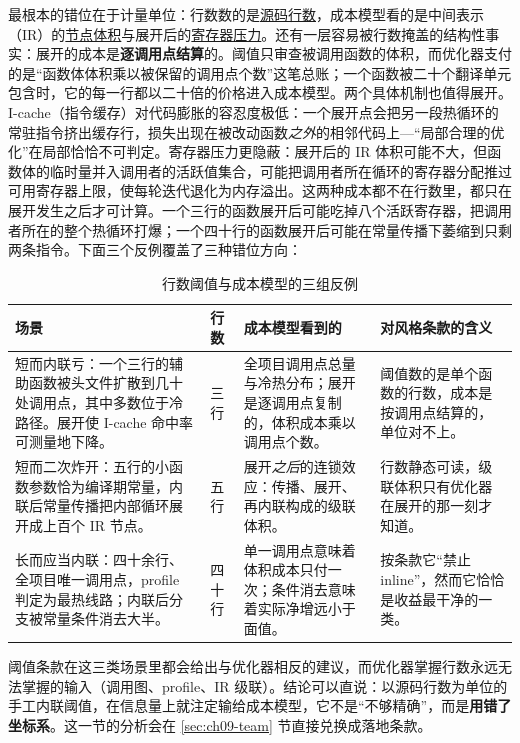 \documentclass[12pt,a4paper,fontset=fandol]{ctexbook}
\begin{document}
最根本的错位在于计量单位：行数数的是\underline{源码行数}，成本模型看的是中间表示（IR）的\underline{节点体积}与展开后的\underline{寄存器压力}。还有一层容易被行数掩盖的结构性事实：展开的成本是\textbf{逐调用点结算}的。阈值只审查被调用函数的体积，而优化器支付的是``函数体体积乘以被保留的调用点个数''这笔总账；一个函数被二十个翻译单元包含时，它的每一行都以二十倍的价格进入成本模型。两个具体机制也值得展开。I-cache（指令缓存）对代码膨胀的容忍度极低：一个展开点会把另一段热循环的常驻指令挤出缓存行，损失出现在被改动函数\textit{之外}的相邻代码上---``局部合理的优化''在局部恰恰不可判定。寄存器压力更隐蔽：展开后的 IR 体积可能不大，但函数体的临时量并入调用者的活跃值集合，可能把调用者所在循环的寄存器分配推过可用寄存器上限，使每轮迭代退化为内存溢出。这两种成本都不在行数里，都只在展开发生之后才可计算。一个三行的函数展开后可能吃掉八个活跃寄存器，把调用者所在的整个热循环打爆；一个四十行的函数展开后可能在常量传播下萎缩到只剩两条指令。下面三个反例覆盖了三种错位方向：

\begin{table}[H]
\centering
\caption{行数阈值与成本模型的三组反例}
\label{tab:ch09-threecase}
\begin{tabularx}{\textwidth}{
  >{\raggedright\arraybackslash}p{}
  >{\raggedright\arraybackslash}p{}
  >{\raggedright\arraybackslash}X
  >{\raggedright\arraybackslash}p{}}
\toprule
场景 & 行数 & 成本模型看到的 & 对风格条款的含义 \\
\midrule
短而内联亏：一个三行的辅助函数被头文件扩散到几十处调用点，其中多数位于冷路径。展开使 I-cache 命中率可测量地下降。 & 三行 & 全项目调用点总量与冷热分布；展开是逐调用点复制的，体积成本乘以调用点个数。 & 阈值数的是单个函数的行数，成本是按调用点结算的，单位对不上。 \\
\addlinespace
短而二次炸开：五行的小函数参数恰为编译期常量，内联后常量传播把内部循环展开成上百个 IR 节点。 & 五行 & 展开\textit{之后}的连锁效应：传播、展开、再内联构成的级联体积。 & 行数静态可读，级联体积只有优化器在展开的那一刻才知道。 \\
\addlinespace
长而应当内联：四十余行、全项目唯一调用点，profile 判定为最热线路；内联后分支被常量条件消去大半。 & 四十行 & 单一调用点意味着体积成本只付一次；条件消去意味着实际净增远小于面值。 & 按条款它``禁止 inline''，然而它恰恰是收益最干净的一类。 \\
\bottomrule
\end{tabularx}
\end{table}

阈值条款在这三类场景里都会给出与优化器相反的建议，而优化器掌握行数永远无法掌握的输入（调用图、profile、IR 级联）。结论可以直说：以源码行数为单位的手工内联阈值，在信息量上就注定输给成本模型，它不是``不够精确''，而是\textbf{用错了坐标系}。这一节的分析会在 \ref{sec:ch09-team} 节直接兑换成落地条款。
\end{document}
